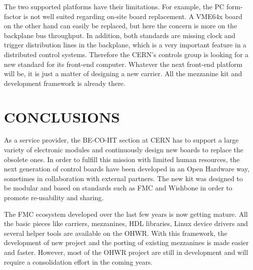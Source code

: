 \documentclass{JAC2003}
\begin{document}
The two supported platforms have their limitations.
For example, the PC form-factor is not well suited regarding on-site board replacement.
A VME64x board on the other hand can easily be replaced, but here the concern is more on the backplane bus throughput.
In addition, both standards are missing clock and trigger distribution lines in the backplane, which is a very important feature in a distributed control systems.
Therefore the CERN's controls group is looking for a new standard for its front-end computer.
Whatever the next front-end platform will be, it is just a matter of designing a new carrier. All the mezzanine kit and development framework is already there.

\section{CONCLUSIONS}

As a service provider, the BE-CO-HT section at CERN has to support a large variety of electronic modules and continuously design new boards to replace the obsolete ones.
In order to fulfill this mission with limited human resources, the next generation of control boards have been developed in an Open Hardware way, sometimes in collaboration with external partners.
The new kit was designed to be modular and based on standards such as FMC and Wishbone in order to promote re-usability and sharing.

The FMC ecosystem developed over the last few years is now getting mature.
All the basic pieces like carriers, mezzanines, HDL libraries, Linux device drivers and several helper tools are available on the OHWR.
With this framework, the development of new project and the porting of existing mezzanines is made easier and faster.
However, most of the OHWR project are still in development and will require a consolidation effort in the coming years.


\end{document}
